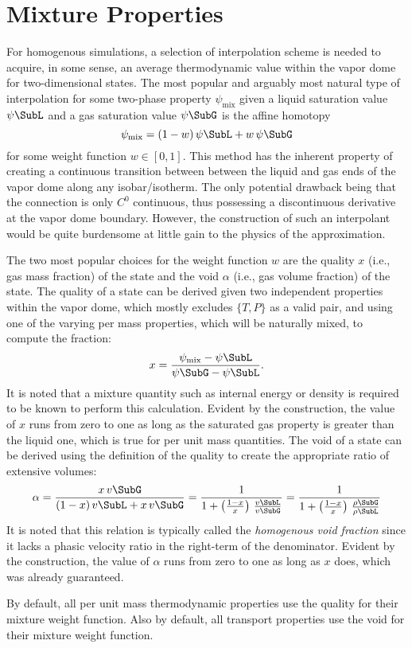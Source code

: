 \section{Mixture Properties}\label{Appendix:Thermodynamics::Section:MixtureProperties}
For homogenous simulations, a selection of interpolation scheme is needed to acquire, in some sense, an average thermodynamic value within the vapor dome for two-dimensional states.
The most popular and arguably most natural type of interpolation for some two-phase property $\psi_{\text{mix}}$ given a liquid saturation value $\psi\SubL$ and a gas saturation value $\psi\SubG$ is the affine homotopy
\begin{equation}
    \psi_{\text{mix}} = (1-w)\,\psi\SubL + w\,\psi\SubG
\end{equation}
for some weight function $w \in [0,1]$.
This method has the inherent property of creating a continuous transition between between the liquid and gas ends of the vapor dome along any isobar/isotherm.
The only potential drawback being that the connection is only $C^0$ continuous, thus possessing a discontinuous derivative at the vapor dome boundary.
However, the construction of such an interpolant would be quite burdensome at little gain to the physics of the approximation.

The two most popular choices for the weight function $w$ are the quality $x$ (i.e., gas mass fraction) of the state and the void $\alpha$ (i.e., gas volume fraction) of the state.
The quality of a state can be derived given two independent properties within the vapor dome, which mostly excludes $\{T,P\}$ as a valid pair, and using one of the varying per mass properties, which will be naturally mixed, to compute the fraction:
\begin{equation}
    x = \frac{\psi_{\text{mix}} - \psi\SubL}{\psi\SubG - \psi\SubL}.
\end{equation}
It is noted that a mixture quantity such as internal energy or density is required to be known to perform this calculation.
Evident by the construction, the value of $x$ runs from zero to one as long as the saturated gas property is greater than the liquid one, which is true for per unit mass quantities.
The void of a state can be derived using the definition of the quality to create the appropriate ratio of extensive volumes:
\begin{equation}
    \alpha = \frac{x\,v\SubG}{(1-x)\,v\SubL + x\,v\SubG} = \frac{1}{1 + \left(\frac{1-x}{x}\right)\,\frac{v\SubL}{v\SubG}} = \frac{1}{1 + \left(\frac{1-x}{x}\right)\,\frac{\rho\SubG}{\rho\SubL}}
\end{equation}
It is noted that this relation is typically called the \textit{homogenous void fraction} since it lacks a phasic velocity ratio in the right-term of the denominator.
Evident by the construction, the value of $\alpha$ runs from zero to one as long as $x$ does, which was already guaranteed.

By default, all per unit mass thermodynamic properties use the quality for their mixture weight function.
Also by default, all transport properties use the void for their mixture weight function.



